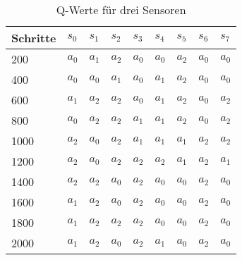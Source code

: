 \begin{table}[h]
  \caption{Q-Werte für drei Sensoren}
  \label{tab:q-values-three-sensors}
  \renewcommand{\arraystretch}{1.2}
  \centering
  \sffamily
  \begin{footnotesize}
    \begin{tabular}{l l l l l l l l l}
    \toprule
    \textbf{Schritte} & \textbf{$s_0$} & \textbf{$s_1$} & \textbf{$s_2$} & \textbf{$s_3$} & \textbf{$s_4$} & \textbf{$s_5$} & \textbf{$s_6$} & \textbf{$s_7$}\\
    \midrule
    200     &       $a_0$   &       $a_1$   &       $a_2$   &       $a_0$   &       $a_0$   &       $a_2$   &       $a_0$   &       $a_0$\\
    400  &       $a_0$   &       $a_0$   &       $a_1$   &  $a_0$    &       $a_1$   &       $a_2$   &       $a_0$   &       $a_0$\\
    600  &       $a_1$   &       $a_2$   &       $a_2$   &       $a_0$   &       $a_1$   &       $a_2$   &       $a_0$   &  $a_2$\\
    800   &       $a_0$   &       $a_2$   &       $a_2$   &       $a_1$   &       $a_1$   &       $a_2$   &       $a_0$   &       $a_2$\\
    1000 &       $a_2$   &       $a_0$   &       $a_2$       &       $a_1$   &       $a_1$   &       $a_1$   &       $a_2$   &       $a_2$\\
    1200 &       $a_2$   &       $a_0$   &       $a_2$   &       $a_2$   &       $a_2$   &       $a_1$   &  $a_2$    &       $a_1$\\
    1400 &       $a_2$   &       $a_2$   &       $a_0$   &       $a_2$   &       $a_0$   &       $a_0$   &       $a_2$   &       $a_0$\\
    1600 &       $a_1$   &       $a_2$       &       $a_0$   &       $a_2$   &       $a_0$   &       $a_0$   &       $a_2$   &       $a_0$\\
    1800 &       $a_1$   &       $a_2$   &       $a_2$   &       $a_2$   &       $a_0$   &  $a_0$    &       $a_2$   &       $a_0$\\
    2000 &       $a_1$   &       $a_2$   &       $a_0$   &       $a_2$   &       $a_1$   &       $a_0$   &       $a_2$   &       $a_0$\\
    \bottomrule
    \end{tabular}
  \end{footnotesize}
  \rmfamily
\end{table}


